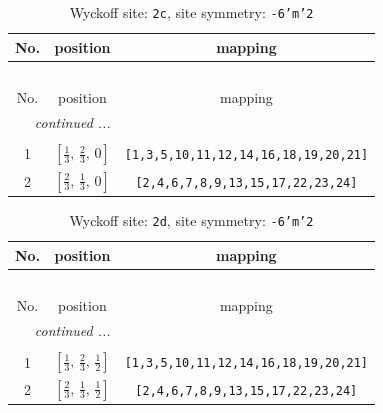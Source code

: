 \documentclass[fleqn,8pt]{jsarticle}
\begin{document}
\begin{longtable}{ccc}
\caption{Wyckoff site: {\tt 2c}, site symmetry: {\tt -6'm'2}}
 \\
 \hline \hline
No. & position & mapping \\ \hline \endfirsthead

\multicolumn{2}{l}{\tablename\ \thetable{}} \\
 \hline \hline
No. & position & mapping \\ \hline \endhead

 \hline \hline
\multicolumn{2}{r}{\footnotesize\it continued ...} \\ \endfoot

 \hline \hline
\multicolumn{2}{r}{} \\ \endlastfoot

1 & $\left[ \frac{1}{3},\, \frac{2}{3},\, 0 \right]$ & {\tt [1,3,5,10,11,12,14,16,18,19,20,21]} \\ \hline
2 & $\left[ \frac{2}{3},\, \frac{1}{3},\, 0 \right]$ & {\tt [2,4,6,7,8,9,13,15,17,22,23,24]} \\
\end{longtable}
\renewcommand{\arraystretch}{1.2}
\begin{longtable}{ccc}
\caption{Wyckoff site: {\tt 2d}, site symmetry: {\tt -6'm'2}}
 \\
 \hline \hline
No. & position & mapping \\ \hline \endfirsthead

\multicolumn{2}{l}{\tablename\ \thetable{}} \\
 \hline \hline
No. & position & mapping \\ \hline \endhead

 \hline \hline
\multicolumn{2}{r}{\footnotesize\it continued ...} \\ \endfoot

 \hline \hline
\multicolumn{2}{r}{} \\ \endlastfoot

1 & $\left[ \frac{1}{3},\, \frac{2}{3},\, \frac{1}{2} \right]$ & {\tt [1,3,5,10,11,12,14,16,18,19,20,21]} \\ \hline
2 & $\left[ \frac{2}{3},\, \frac{1}{3},\, \frac{1}{2} \right]$ & {\tt [2,4,6,7,8,9,13,15,17,22,23,24]} \\
\end{longtable}
\renewcommand{\arraystretch}{1.2}
\end{document}
